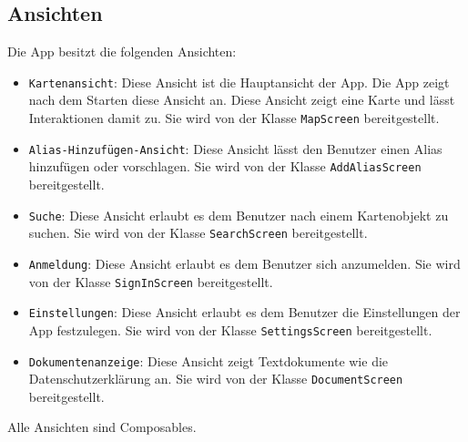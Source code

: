 \subsection{Ansichten}
Die App besitzt die folgenden Ansichten:
\begin{itemize}
    \item \texttt{Kartenansicht}: Diese Ansicht ist die Hauptansicht der App. Die App zeigt nach dem Starten diese Ansicht an. 
    Diese Ansicht zeigt eine Karte und lässt Interaktionen damit zu.
    Sie wird von der Klasse \texttt{MapScreen} bereitgestellt.
    \item \texttt{Alias-Hinzufügen-Ansicht}: Diese Ansicht lässt den Benutzer einen Alias hinzufügen oder vorschlagen.
    Sie wird von der Klasse \texttt{AddAliasScreen} bereitgestellt.
    \item \texttt{Suche}: Diese Ansicht erlaubt es dem Benutzer nach einem Kartenobjekt zu suchen.
    Sie wird von der Klasse \texttt{SearchScreen} bereitgestellt.
    \item \texttt{Anmeldung}: Diese Ansicht erlaubt es dem Benutzer sich anzumelden.
    Sie wird von der Klasse \texttt{SignInScreen} bereitgestellt.
    \item \texttt{Einstellungen}: Diese Ansicht erlaubt es dem Benutzer die Einstellungen der App festzulegen.
    Sie wird von der Klasse \texttt{SettingsScreen} bereitgestellt.
    \item \texttt{Dokumentenanzeige}: Diese Ansicht zeigt Textdokumente wie die Datenschutzerklärung an.
    Sie wird von der Klasse \texttt{DocumentScreen} bereitgestellt.
\end{itemize}
Alle Ansichten sind Composables.
